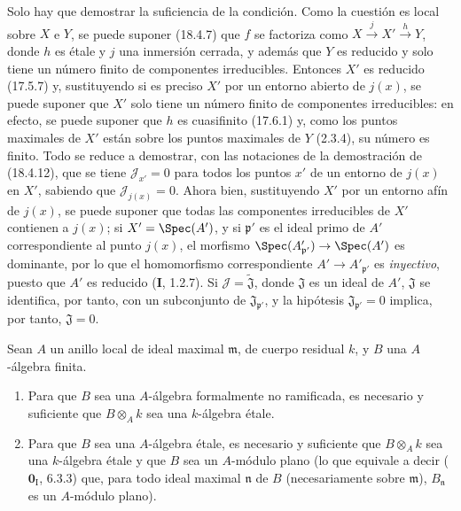 Solo hay que demostrar la suficiencia de la condición. Como la cuestión es local sobre $X$ e $Y$, se puede suponer (18.4.7) que $f$ se factoriza como $X\xrightarrow{j}X'\xrightarrow{h}Y$, donde $h$ es étale y $j$ una inmersión cerrada, y además que $Y$ es reducido y solo tiene un número finito de componentes irreducibles. Entonces $X'$ es reducido (17.5.7) y, sustituyendo si es preciso $X'$ por un entorno abierto de $j(x)$, se puede suponer que $X'$ solo tiene un número finito de componentes irreducibles: en efecto, se puede suponer que $h$ es cuasifinito (17.6.1) y, como los puntos maximales de $X'$ están sobre los puntos maximales de $Y$ (2.3.4), su número es finito. Todo se reduce a demostrar, con las notaciones de la demostración de (18.4.12), que se tiene $\mathscr J_{x'}=0$ para todos los puntos $x'$ de un entorno de $j(x)$ en $X'$, sabiendo que $\mathscr J_{j(x)}=0$. Ahora bien, sustituyendo $X'$ por un entorno afín de $j(x)$, se puede suponer que todas las componentes irreducibles de $X'$ contienen a $j(x)$; si $X'=\Spec(A')$, y si $\mathfrak p'$ es el ideal primo de $A'$ correspondiente al punto $j(x)$, el morfismo $\Spec(A'_{\mathfrak p'})\to\Spec(A')$ es dominante, por lo que el homomorfismo correspondiente $A'\to A'_{\mathfrak p'}$ es \emph{inyectivo}, puesto que $A'$ es reducido (\textbf I, 1.2.7). Si $\mathscr J=\widetilde{\mathfrak J}$, donde $\mathfrak J$ es un ideal de $A'$, $\mathfrak J$ se identifica, por tanto, con un subconjunto de $\mathfrak J_{\mathfrak p'}$, y la hipótesis $\mathfrak J_{\mathfrak p'}=0$ implica, por tanto, $\mathfrak J=0$.

\begin{corollary}[18.4.14]
\label{IV.18.4.14}
Sean $A$ un anillo local de ideal maximal $\mathfrak m$, de cuerpo residual $k$, y $B$ una $A$-álgebra finita.


\begin{enumerate}
  \item[\textup{(i)}] Para que $B$ sea una $A$-álgebra formalmente no ramificada, es necesario y suficiente que $B\otimes_A k$ sea una $k$-álgebra étale.
  \item[\textup{(ii)}] Para que $B$ sea una $A$-álgebra étale, es necesario y suficiente que $B\otimes_A k$ sea una $k$-álgebra étale y que $B$ sea un $A$-módulo plano \textup{(lo que equivale a decir ($\mathbf 0_{\mathrm I}$, 6.3.3) que, para todo ideal maximal $\mathfrak n$ de $B$ (necesariamente sobre $\mathfrak m$), $B_{\mathfrak n}$ es un $A$-módulo plano).}
\end{enumerate}
\end{corollary}

